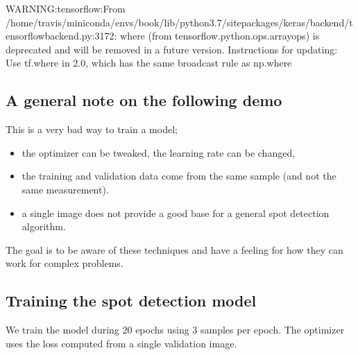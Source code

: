 \documentclass[letterpaper,10pt,english]{sphinxmanual}
\begin{document}
\begin{sphinxVerbatim}[commandchars=\\\{\}]
WARNING:tensorflow:From /home/travis/miniconda/envs/book/lib/python3.7/site\PYGZhy{}packages/keras/backend/tensorflow\PYGZus{}backend.py:3172: where (from tensorflow.python.ops.array\PYGZus{}ops) is deprecated and will be removed in a future version.
Instructions for updating:
Use tf.where in 2.0, which has the same broadcast rule as np.where
\end{sphinxVerbatim}


\subsection{A general note on the following demo}
\label{\detokenize{ML4NeutronImageSegmentation:a-general-note-on-the-following-demo}}
This is a very bad way to train a model;
\begin{itemize}
\item {} 
the optimizer can be tweaked,  the learning rate can be changed,

\item {} 
the training and validation data  come from the same sample (and  not the same measurement).

\item {} 
a single image does not provide a good base for a general spot detection algorithm.

\end{itemize}

The goal is to be aware of these techniques and have a feeling for how they can work for complex problems.


\subsection{Training the spot detection model}
\label{\detokenize{ML4NeutronImageSegmentation:training-the-spot-detection-model}}
We train the model during 20 epochs using 3 samples per epoch. The optimizer uses the loss computed from a single validation image.

\begin{sphinxVerbatim}[commandchars=\\\{\}]
  
   
                           
                            
\end{sphinxVerbatim}
\end{document}
